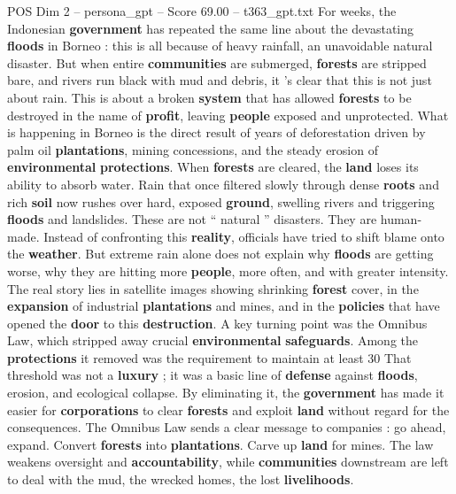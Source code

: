 \begin{textsample}{POS Dim 2 – persona\_gpt – Score 69.00 – t363\_gpt.txt}  \label{ex:f2_pos_002}
For weeks, the Indonesian \textbf{government} has repeated the same line about the devastating \textbf{floods} in Borneo : this is all because of heavy rainfall, an unavoidable natural disaster.
But when entire \textbf{communities} are submerged, \textbf{forests} are stripped bare, and rivers run black with mud and debris, it ’s clear that this is not just about rain.
This is about a broken \textbf{system} that has allowed \textbf{forests} to be destroyed in the name of \textbf{profit}, leaving \textbf{people} exposed and unprotected.
What is happening in Borneo is the direct result of years of deforestation driven by palm oil \textbf{plantations}, mining concessions, and the steady erosion of \textbf{environmental} \textbf{protections}.
When \textbf{forests} are cleared, the \textbf{land} loses its ability to absorb water.
Rain that once filtered slowly through dense \textbf{roots} and rich \textbf{soil} now rushes over hard, exposed \textbf{ground}, swelling rivers and triggering \textbf{floods} and landslides.
These are not “ natural ” disasters.
They are human-made.
Instead of confronting this \textbf{reality}, officials have tried to shift blame onto the \textbf{weather}.
But extreme rain alone does not explain why \textbf{floods} are getting worse, why they are hitting more \textbf{people}, more often, and with greater intensity.
The real story lies in satellite images showing shrinking \textbf{forest} cover, in the \textbf{expansion} of industrial \textbf{plantations} and mines, and in the \textbf{policies} that have opened the \textbf{door} to this \textbf{destruction}.
A key turning point was the Omnibus Law, which stripped away crucial \textbf{environmental} \textbf{safeguards}.
Among the \textbf{protections} it removed was the requirement to maintain at least 30 %
That threshold was not a \textbf{luxury} ; it was a basic line of \textbf{defense} against \textbf{floods}, erosion, and ecological collapse.
By eliminating it, the \textbf{government} has made it easier for \textbf{corporations} to clear \textbf{forests} and exploit \textbf{land} without regard for the consequences.
The Omnibus Law sends a clear message to companies : go ahead, expand.
Convert \textbf{forests} into \textbf{plantations}.
Carve up \textbf{land} for mines.
The law weakens oversight and \textbf{accountability}, while \textbf{communities} downstream are left to deal with the mud, the wrecked homes, the lost \textbf{livelihoods}.

\end{textsample}
